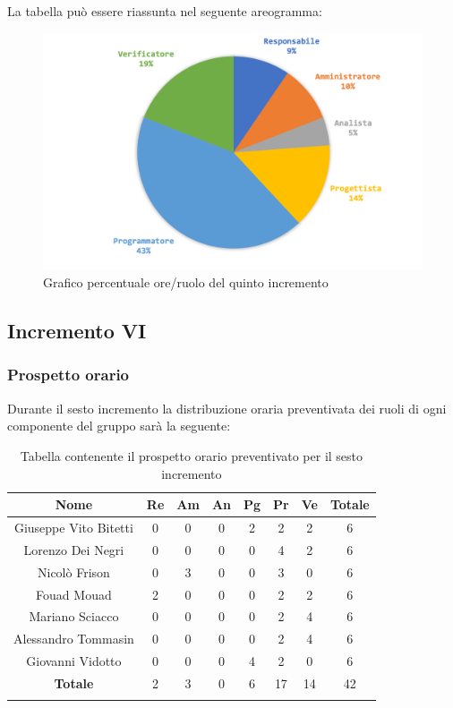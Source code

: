 		La tabella può essere riassunta nel seguente areogramma:
		\begin{figure}[H]
			\centering
			\includegraphics[width=0.8\linewidth]{./images/preventivo/incremento5-2.png}
			\caption{Grafico percentuale ore/ruolo del quinto incremento}
			\label{fig:grafico costi ruolo incremento V}
		\end{figure}
		
		
		
	\subsection{Incremento VI}
		\subsubsection{Prospetto orario}
		Durante il sesto incremento la distribuzione oraria preventivata dei ruoli di ogni componente del gruppo sarà la seguente:
		
		\begin{longtable}{|c|c|c|c|c|c|c|c|}
			\hline
			\rowcolor{lighter-grayer}
			\textbf{Nome} & \textbf{Re} & \textbf{Am} & \textbf{An} & \textbf{Pg}  & \textbf{Pr}   & \textbf{Ve} & \textbf{Totale} \\
			\hline
			\endfirsthead
			
			\hline
			Giuseppe Vito Bitetti 		 & 0 & 0 & 0 & 2 & 2 & 2 & 6\\
			\hline
			\hline
			Lorenzo Dei Negri			 & 0 & 0 & 0 & 0 & 4 & 2 & 6\\
			\hline
			\hline
			Nicolò Frison				      & 0 & 3 & 0 & 0 & 3 & 0 & 6\\
			\hline
			\hline
			Fouad Mouad 				   & 2 & 0 & 0 & 0 & 2 & 2 & 6\\
			\hline
			\hline
			Mariano Sciacco 			 & 0 & 0 & 0 & 0 & 2 & 4 & 6\\
			\hline
			\hline
			Alessandro Tommasin    & 0 & 0 & 0 & 0 & 2 & 4 & 6\\
			\hline
			\hline
			Giovanni Vidotto 			  & 0 & 0 & 0 & 4 & 2 & 0 & 6\\
			\hline 
			\textbf{Totale}			 		& 2 & 3 & 0 & 6 & 17 & 14 & 42\\
			\hline
			\caption{Tabella contenente il prospetto orario preventivato per il sesto incremento}
		\end{longtable}
		\pagebreak
		
